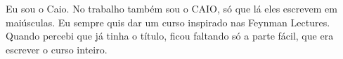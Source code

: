
Eu sou o Caio. No trabalho também sou o CAIO, só que lá eles escrevem em maiúsculas. Eu sempre quis dar um curso inspirado nas Feynman Lectures. Quando percebi que já tinha o título, ficou faltando só a parte fácil, que era escrever o curso inteiro.
